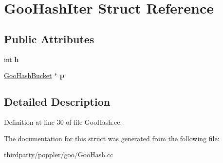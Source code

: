 \hypertarget{struct_goo_hash_iter}{}\section{Goo\+Hash\+Iter Struct Reference}
\label{struct_goo_hash_iter}
\subsection*{Public Attributes}
\begin{DoxyCompactItemize}
\item 
\mbox{\label{struct_goo_hash_iter_a7505b0e4df665884992770bd24ce6200}} 
int {\bfseries h}
\item 
\mbox{\label{struct_goo_hash_iter_a574eb14b96e3252939890be9baf946b2}} 
\hyperlink{struct_goo_hash_bucket}{Goo\+Hash\+Bucket} $\ast$ {\bfseries p}
\end{DoxyCompactItemize}


\subsection{Detailed Description}


Definition at line 30 of file Goo\+Hash.\+cc.



The documentation for this struct was generated from the following file\+:\begin{DoxyCompactItemize}
\item 
thirdparty/poppler/goo/Goo\+Hash.\+cc\end{DoxyCompactItemize}
